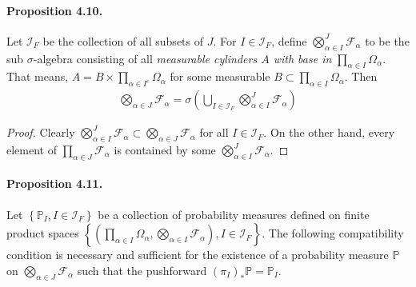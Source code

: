 \documentclass{article}
\numberwithin{equation}{section}
\renewcommand{\P}{\mathbb{P}}
\theoremstyle{plain}
\theoremstyle{definition}
\begin{document}
\paragraph{Proposition 4.10.\label{prop:4.10}} Let $\mathcal{I}_F$ be the collection of all  subsets of $J$. For $I\in\mathcal{I}_F$, define $\bigotimes_{\alpha\in I}^J\mathscr{F}_\alpha$ to be the sub $\sigma$-algebra consisting of all \textit{measurable cylinders $A$ with base in} $\prod_{\alpha\in I}\Omega_\alpha$. That means, $A=B\times\prod_{\alpha\in I^c}\Omega_\alpha$ for some measurable $B\subset\prod_{\alpha\in I}\Omega_\alpha$. Then
\begin{align*}
	\bigotimes_{\alpha\in J}\mathscr{F}_\alpha=\sigma\left(\bigcup_{I\in\mathcal{I}_F}\bigotimes_{\alpha\in I}^J\mathscr{F}_\alpha\right)
\end{align*}
\begin{proof}
Clearly $\bigotimes_{\alpha\in I}^J\mathscr{F}_\alpha\subset\bigotimes_{\alpha\in J}\mathscr{F}_\alpha$ for all $I\in\mathcal{I}_F$. On the other hand, every element of $\prod_{\alpha\in J}\mathscr{F}_\alpha$ is contained by some $\bigotimes_{\alpha\in I}^J\mathscr{F}_\alpha$.
\end{proof}

\paragraph{Proposition 4.11.\label{prop:4.11}} Let $\left\{\P_I,I\in\mathcal{I}_F\right\}$ be a collection of probability measures defined on finite product spaces $\left\{\left(\prod_{\alpha\in I}\Omega_\alpha,\bigotimes_{\alpha\in I}\mathscr{F}_\alpha\right),I\in\mathcal{I}_F\right\}$. The following compatibility condition is necessary and sufficient for the existence of a  probability measure $\P$ on $\bigotimes_{\alpha\in J}\mathscr{F}_\alpha$ such that the pushforward $(\pi_{I})_*\P=\P_I$.
\end{document}
